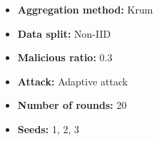 \documentclass[a4j,twocolumn,dvipdfmx]{jsarticle}
\begin{document}
\begin{itemize}
    \item \textbf{Aggregation method:} Krum
    \item \textbf{Data split:} Non-IID
    \item \textbf{Malicious ratio:} 0.3
    \item \textbf{Attack:} Adaptive attack
    \item \textbf{Number of rounds:} 20
    \item \textbf{Seeds:} 1, 2, 3
\end{itemize}


\begin{table}[H]
\centering

\caption{Krum（Non-IID，悪性クライアント比率 0.3）における
Accuracy および Loss}

\label{tab:krum_non_iid_ratio0.3}

\footnotesize
\setlength{\tabcolsep}{2.5pt}
\renewcommand{\arraystretch}{0.90}

\end{table}
\end{document}
